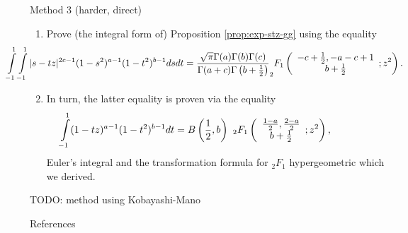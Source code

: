 \documentclass[pdf,notes]{beamer}
\begin{document}
\begin{frame}{Method 3 (harder, direct)}
	\begin{enumerate}
		\item Prove (the integral form of) Proposition \ref{prop:exp-stz-gg}
			using the equality {\scriptsize \begin{equation}
				\kern-1.5cm \int_{- 1}^1 \int_{- 1}^1 | s - t z |^{2 c - 1} (1 - s^2)^{a - 1} (1 -
				t^2)^{b - 1} d s d t = \frac{\sqrt{\pi} \Gamma (a) \Gamma (b) \Gamma
			(c)}{\Gamma (a + c) \Gamma \left( b + \frac{1}{2} \right)} _2 F_1 \left(
			\begin{array}{c}
				  - c + \frac{1}{2}, - a - c + 1\\
				    b + \frac{1}{2}
			    \end{array} ; z^2 \right) .
				\label{eqn:prop21}
			\end{equation}}
		\item In turn, the latter equality is proven via the equality {\scriptsize \begin{equation}
				\kern-1.5cm \int_{-1}^1(1-t z)^{a-1}(1-t^2)^{b-1}d t=B\left(\frac{1}{2},b  \right)\ {}_2F_1\left( 
				\begin{array}[]{c}
					\frac{1-a}{2},\frac{2-a}{2}\\b+\frac{1}{2}
				\end{array}
				;z^2 \right),
				\label{eqn:lem31}
			\end{equation}}
			Euler's integral and the transformation formula for $_2F_1$ hypergeometric which we derived.
	\end{enumerate}
\end{frame}
\begin{frame}
	TODO: method using Kobayashi-Mano
\end{frame}
\begin{frame}[allowframebreaks]{References}
	
	\nocite{Selberg:411367}
	\nocite{warnaar2010sl3}
	\nocite{dotsenko1985four}
	\nocite{tarasov2003selberg}

\end{frame}
\end{document}
